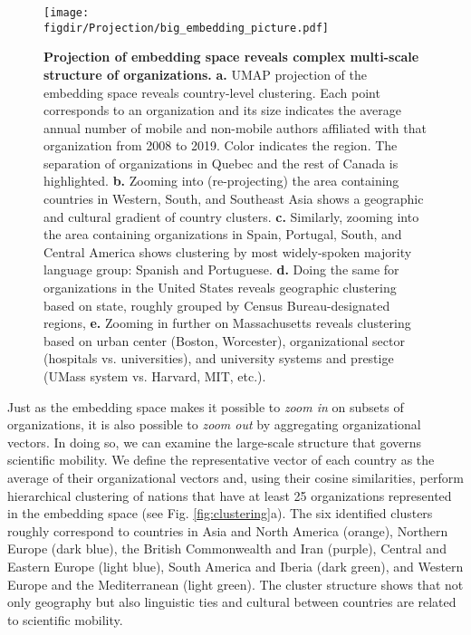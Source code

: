 \documentclass[12pt]{article} %
\def\figdir{../Figs}
\begin{document}
%
%
\begin{figure}[hp!]
	\centering
	\texttt{[image: \\figdir/Projection/big\_embedding\_picture.pdf]}
	\caption{
		\textbf{Projection of embedding space reveals complex multi-scale structure of organizations.}
		\textbf{a.}
		UMAP projection \autocite{mcinnes2018umap} of the embedding space reveals country-level clustering.
		Each point corresponds to an organization and its size indicates the average annual number of mobile and non-mobile authors affiliated with that organization from 2008 to 2019.
		Color indicates the region.
		The separation of organizations in Quebec and the rest of Canada is highlighted.
		\textbf{b.} Zooming into (re-projecting) the area containing countries in Western, South, and Southeast Asia shows a geographic and cultural gradient of country clusters.
		\textbf{c.} Similarly, zooming into the area containing organizations in Spain, Portugal, South, and Central America shows clustering by most widely-spoken majority language group: Spanish and Portuguese.
		\textbf{d.} Doing the same for organizations in the United States reveals geographic clustering based on state, roughly grouped by Census Bureau-designated regions,
		\textbf{e.} Zooming in further on Massachusetts reveals clustering based on urban center (Boston, Worcester), organizational sector (hospitals vs. universities), and university systems and prestige (UMass system vs. Harvard, MIT, etc.).
	}
	\label{fig:projection}
\end{figure}


Just as the embedding space makes it possible to \textit{zoom in} on subsets of organizations, it is also possible to \textit{zoom out} by aggregating organizational vectors.
In doing so, we can examine the large-scale structure that governs scientific mobility.
We define the representative vector of each country as the average of their organizational vectors and, using their cosine similarities, perform hierarchical clustering of nations that have at least 25 organizations represented in the embedding space (see Fig. \ref{fig:clustering}a).
The six identified clusters roughly correspond to countries in Asia and North America (orange), Northern Europe (dark blue), the British Commonwealth and Iran (purple), Central and Eastern Europe (light blue), South America and Iberia (dark green), and Western Europe and the Mediterranean (light green).
The cluster structure shows that not only geography but also linguistic ties and cultural between countries are related to scientific mobility.
\end{document}

